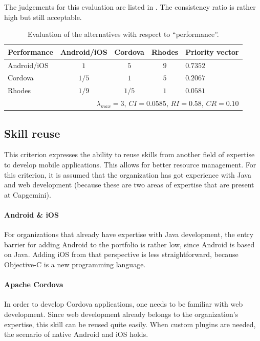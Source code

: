 The judgements for this evaluation are listed in . The consistency ratio is rather high but still acceptable.

\begin{table}[h!]
    \centering
    \begin{tabular}{lcccl}
        \hline
        \textbf{Performance} & Android/iOS & Cordova & Rhodes & Priority vector \\
        \hline
        Android/iOS          & $1$         & $5$     & $9$    & $0.7352$        \\
        Cordova              & $1/5$       & $1$     & $5$    & $0.2067$        \\
        Rhodes               & $1/9$       & $1/5$   & $1$    & $0.0581$        \\
        \hline
        \multicolumn{5}{r}{$\lambda_{max} = 3$, $CI = 0.0585$, $RI = 0.58$, $CR = 0.10$}\\
        \hline
    \end{tabular}
    \caption{Evaluation of the alternatives with respect to ``performance''.}
    \label{tab:performance}
\end{table}

\subsection{Skill reuse}

This criterion expresses the ability to reuse skills from another field of expertise to develop mobile applications. This allows for better resource management. For this criterion, it is assumed that the organization has got experience with Java and web development (because these are two areas of expertise that are present at Capgemini). 

\paragraph{Android \& iOS} For organizations that already have expertise with Java development, the entry barrier for adding Android to the portfolio is rather low, since Android is based on Java. Adding iOS from that perspective is less straightforward, because Objective-C is a new programming language.

\paragraph{Apache Cordova} In order to develop Cordova applications, one needs to be familiar with web development. Since web development already belongs to the organization's expertise, this skill can be reused quite easily. When custom plugins are needed, the scenario of native Android and iOS holds.

